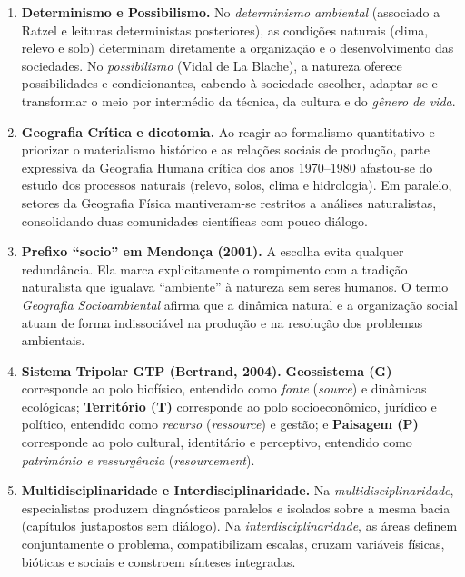 \begin{boxGabarito}
\begin{enumerate}[leftmargin=1.8em, itemsep=4pt]
  \item \textbf{Determinismo e Possibilismo.} No \textit{determinismo ambiental} (associado a Ratzel e leituras deterministas posteriores), as condições naturais (clima, relevo e solo) determinam diretamente a organização e o desenvolvimento das sociedades. No \textit{possibilismo} (Vidal de La Blache), a natureza oferece possibilidades e condicionantes, cabendo à sociedade escolher, adaptar-se e transformar o meio por intermédio da técnica, da cultura e do \textit{gênero de vida}.
  \item \textbf{Geografia Crítica e dicotomia.} Ao reagir ao formalismo quantitativo e priorizar o materialismo histórico e as relações sociais de produção, parte expressiva da Geografia Humana crítica dos anos 1970--1980 afastou-se do estudo dos processos naturais (relevo, solos, clima e hidrologia). Em paralelo, setores da Geografia Física mantiveram-se restritos a análises naturalistas, consolidando duas comunidades científicas com pouco diálogo.
  \item \textbf{Prefixo ``socio'' em Mendonça (2001).} A escolha evita qualquer redundância. Ela marca explicitamente o rompimento com a tradição naturalista que igualava ``ambiente'' à natureza sem seres humanos. O termo \textit{Geografia Socioambiental} afirma que a dinâmica natural e a organização social atuam de forma indissociável na produção e na resolução dos problemas ambientais.
  \item \textbf{Sistema Tripolar GTP (Bertrand, 2004).} \textbf{Geossistema (G)} corresponde ao polo biofísico, entendido como \textit{fonte} (\textit{source}) e dinâmicas ecológicas; \textbf{Território (T)} corresponde ao polo socioeconômico, jurídico e político, entendido como \textit{recurso} (\textit{ressource}) e gestão; e \textbf{Paisagem (P)} corresponde ao polo cultural, identitário e perceptivo, entendido como \textit{patrimônio e ressurgência} (\textit{resourcement}).
  \item \textbf{Multidisciplinaridade e Interdisciplinaridade.} Na \textit{multidisciplinaridade}, especialistas produzem diagnósticos paralelos e isolados sobre a mesma bacia (capítulos justapostos sem diálogo). Na \textit{interdisciplinaridade}, as áreas definem conjuntamente o problema, compatibilizam escalas, cruzam variáveis físicas, bióticas e sociais e constroem sínteses integradas.
\end{enumerate}
\end{boxGabarito}

